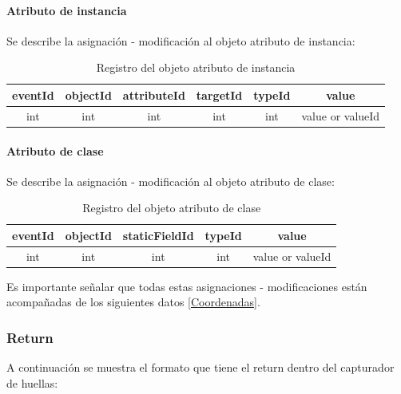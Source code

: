 \documentclass[12pt,legalpaper]{report}
\begin{document}
				\paragraph{Atributo de instancia}

Se describe la asignación - modificación al objeto atributo de instancia:\\

\begin{table}[!h]
\begin{center}
\begin{tabular}{| c | c | c | c | c | c |}
\hline
\rowcolor[gray]{0.9}eventId & objectId & attributeId & targetId & typeId & value\\
\hline
int & int & int & int & int & value or valueId\footnotemark[1]\\
\hline
\end{tabular}
\caption{Registro del objeto atributo de instancia} 
\end{center}
\end{table}


				\paragraph{Atributo de clase}

Se describe la asignación - modificación al objeto atributo de clase:\\

\begin{table}[!h]
\begin{center}
\begin{tabular}{| c | c | c | c | c |}
\hline
\rowcolor[gray]{0.9}eventId & objectId & staticFieldId & typeId & value\\
\hline
int & int & int & int & value or valueId\footnotemark[1]\\
\hline
\end{tabular}
\caption{Registro del objeto atributo de clase} 
\end{center}
\end{table}

Es importante señalar que todas estas asignaciones - modificaciones están acompañadas de los siguientes datos \ref{Coordenadas}.

			\subsubsection{Return}

A continuación se muestra el formato que tiene el return dentro del capturador de huellas:\\
\end{document}
